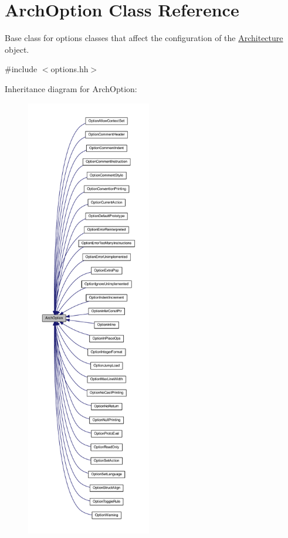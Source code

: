 \hypertarget{class_arch_option}{}\section{Arch\+Option Class Reference}
\label{class_arch_option}


Base class for options classes that affect the configuration of the \mbox{\hyperlink{class_architecture}{Architecture}} object.  




{\ttfamily \#include $<$options.\+hh$>$}



Inheritance diagram for Arch\+Option\+:
\nopagebreak
\begin{figure}[H]
\begin{center}
\leavevmode
\includegraphics[height=550pt]{class_arch_option__inherit__graph}
\end{center}
\end{figure}
